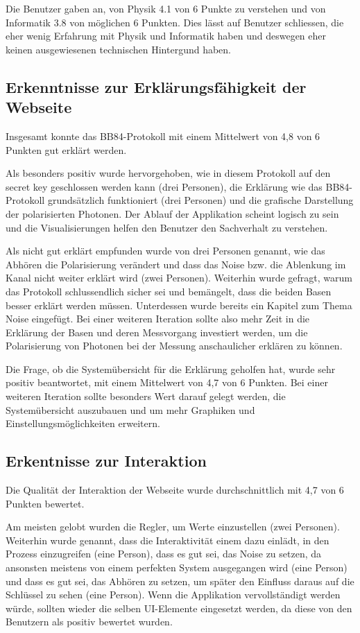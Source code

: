 \documentclass[a4paper,10.2pt,pdftex]{scrartcl}%
\begin{document}
Die Benutzer gaben an, von Physik 4.1 von 6 Punkte zu verstehen und von Informatik 3.8 von möglichen 6 Punkten. Dies lässt auf Benutzer schliessen, die eher wenig Erfahrung mit Physik und Informatik haben und deswegen eher keinen ausgewiesenen technischen Hintergund haben.
\subsection{Erkenntnisse zur Erklärungsfähigkeit der Webseite}
Insgesamt konnte das BB84-Protokoll mit einem Mittelwert von 4,8 von 6 Punkten gut erklärt werden. 

Als besonders positiv wurde  hervorgehoben, wie in diesem Protokoll auf den secret key geschlossen werden kann (drei Personen), die Erklärung wie das BB84-Protokoll grundsätzlich funktioniert (drei Personen) und die grafische Darstellung der polarisierten Photonen. Der Ablauf der Applikation scheint logisch zu sein und die Visualisierungen helfen den Benutzer den Sachverhalt zu verstehen.

Als nicht gut erklärt empfunden wurde von drei Personen genannt, wie das Abhören die Polarisierung verändert und dass das Noise bzw. die Ablenkung im Kanal nicht weiter erklärt wird (zwei Personen). Weiterhin wurde gefragt, warum das Protokoll schlussendlich sicher sei und bemängelt, dass die beiden Basen besser erklärt werden müssen. Unterdessen wurde bereits ein Kapitel zum Thema Noise eingefügt. Bei einer weiteren Iteration sollte also mehr Zeit in die Erklärung der Basen und deren Messvorgang investiert werden, um die Polarisierung von Photonen bei der Messung anschaulicher erklären zu können.

Die Frage, ob die Systemübersicht für die Erklärung geholfen hat, wurde sehr positiv beantwortet, mit einem Mittelwert von 4,7 von 6 Punkten. Bei einer weiteren Iteration sollte besonders Wert darauf gelegt werden, die Systemübersicht auszubauen und um mehr Graphiken und Einstellungsmöglichkeiten erweitern. 
\subsection{Erkentnisse zur Interaktion}
Die Qualität der Interaktion der Webseite wurde durchschnittlich mit 4,7 von 6 Punkten bewertet.

Am meisten gelobt wurden die Regler, um Werte einzustellen (zwei Personen). Weiterhin wurde genannt, dass die Interaktivität einem dazu einlädt, in den Prozess einzugreifen (eine Person), dass es gut sei, das Noise zu setzen, da ansonsten meistens von einem perfekten System ausgegangen wird (eine Person) und dass es gut sei, das Abhören zu setzen, um später den Einfluss daraus auf die Schlüssel zu sehen (eine Person). Wenn die Applikation vervollständigt werden würde, sollten wieder die selben UI-Elemente eingesetzt werden, da diese von den Benutzern als positiv bewertet wurden.
\end{document}
